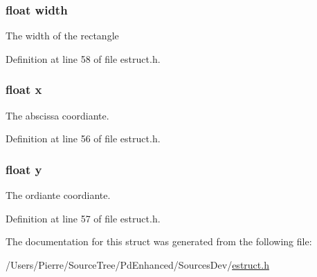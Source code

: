 \hypertarget{struct__rect_ae426f00e82704fa09578f5446e22d915}{
\subsubsection[{width}]{\setlength{\rightskip}{0pt plus 5cm}float width}}\label{struct__rect_ae426f00e82704fa09578f5446e22d915}
The width of the rectangle 

Definition at line 58 of file estruct.\-h.

\hypertarget{struct__rect_ad0da36b2558901e21e7a30f6c227a45e}{
\subsubsection[{x}]{\setlength{\rightskip}{0pt plus 5cm}float x}}\label{struct__rect_ad0da36b2558901e21e7a30f6c227a45e}
The abscissa coordiante. 

Definition at line 56 of file estruct.\-h.

\hypertarget{struct__rect_aa4f0d3eebc3c443f9be81bf48561a217}{
\subsubsection[{y}]{\setlength{\rightskip}{0pt plus 5cm}float y}}\label{struct__rect_aa4f0d3eebc3c443f9be81bf48561a217}
The ordiante coordiante. 

Definition at line 57 of file estruct.\-h.



The documentation for this struct was generated from the following file\-:\begin{DoxyCompactItemize}
\item 
/\-Users/\-Pierre/\-Source\-Tree/\-Pd\-Enhanced/\-Sources\-Dev/\hyperlink{estruct_8h}{estruct.\-h}\end{DoxyCompactItemize}
